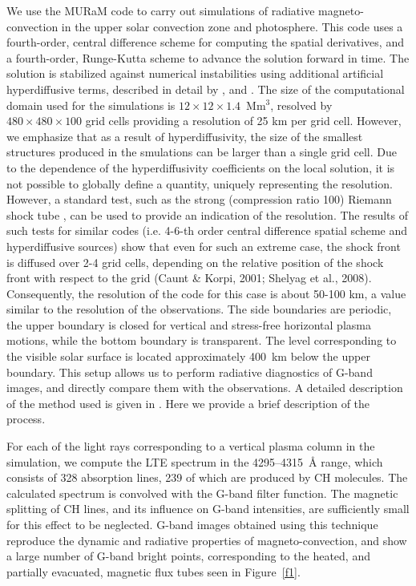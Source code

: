 \documentclass{emulateapj}
\begin{document}
We use the MURaM code \citep{shelyag1} to carry out simulations of radiative magneto-convection in the upper solar convection zone and photosphere. This code uses a fourth-order, central difference scheme for computing the spatial derivatives, and a fourth-order, Runge-Kutta scheme to advance the solution forward in time. The solution is stabilized against numerical instabilities using additional artificial hyperdiffusive terms, described in detail by \cite{caunt}, \cite{shelyag1} and \cite{shelyag3}. The size of the computational domain used for the simulations is $12 \times 12 \times 1.4$~Mm$^{3}$, resolved by $480 \times 480 \times 100$ grid cells providing a resolution of 25 km per grid cell. However, we emphasize that as a result of hyperdiffusivity, the size of the smallest structures produced in the smulations can be larger than a single grid cell.  Due to the dependence of the hyperdiffusivity coefficients on the local solution, it is not possible to globally define a quantity, uniquely representing the resolution.  However, a standard test, such as the strong (compression ratio 100) Riemann shock tube \cite[]{Sod78}, can be used to provide an indication of the resolution. The results of such tests for similar codes (i.e. 4-6-th order central difference spatial scheme and hyperdiffusive sources) show that even for such an extreme  case, the shock front is diffused over 2-4 grid cells, depending on the relative position of the shock front with respect to the grid (Caunt \& Korpi, 2001; Shelyag et al., 2008). Consequently, the resolution of the code for this case is about 50-100 km, a value similar to the resolution of the observations. The side boundaries are periodic, the upper boundary is closed for vertical and stress-free horizontal plasma motions, while the bottom boundary is transparent. The level corresponding to the visible solar surface is located approximately 400~km below the upper boundary. This setup allows us to perform radiative diagnostics of G-band images, and directly compare them with the observations. A detailed description of the method used is given in \cite{shelyag2}. Here we provide a brief description of the process. 

For each of the light rays corresponding to a vertical plasma column in the simulation, we compute the LTE spectrum in the 4295--4315~{\AA} range, which consists of 328 absorption lines, 239 of which are produced by CH molecules. The calculated spectrum is convolved with the  G-band filter function. The magnetic splitting of CH lines, and its influence on G-band intensities, are sufficiently small for this effect to be neglected. G-band images obtained using this technique reproduce the dynamic and radiative properties of magneto-convection, and show a large number of G-band bright points, corresponding to the heated, and partially evacuated, magnetic flux tubes seen in Figure~\ref{f1}.
\end{document}
